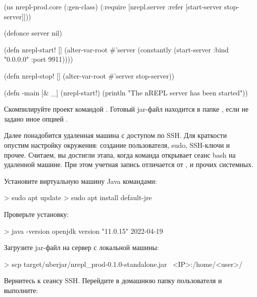 \begin{english}
  \begin{clojure}
(ns nrepl-prod.core
  (:gen-class)
  (:require
   [nrepl.server :refer [start-server stop-server]]))

(defonce server nil)

(defn nrepl-start! []
  (alter-var-root
   #'server
   (constantly
    (start-server :bind "0.0.0.0" :port 9911))))

(defn nrepl-stop! []
  (alter-var-root #'server stop-server))

(defn -main
  [& _]
  (nrepl-start!)
  (println "The nREPL server has been started"))
  \end{clojure}
\end{english}

Скомпилируйте проект командой . Готовый jar-файл находится в папке , если не задано иное опцией .

Далее понадобится удаленная машина с доступом по SSH. Для краткости опустим настройку окружения: создание пользователя, sudo, SSH-ключи и прочее. Считаем, вы достигли этапа, когда команда  открывает сеанс bash на удаленной машине. При этом учетная запись отличается от ,  и прочих системных.

Установите виртуальную машину Java командами:

\begin{english}
  \begin{bash}
> sudo apt update
> sudo apt install default-jre
  \end{bash}
\end{english}

Проверьте установку:

\begin{english}
  \begin{bash}
> java -version
openjdk version "11.0.15" 2022-04-19
  \end{bash}
\end{english}

Загрузите jar-файл на сервер с локальной машины:

\begin{english}
  \begin{bash}
> scp target/uberjar/nrepl_prod-0.1.0-standalone.jar \
      <IP>:/home/<user>/
  \end{bash}
\end{english}

Вернитесь к сеансу SSH. Перейдите в домашнюю папку пользователя и выполните:

